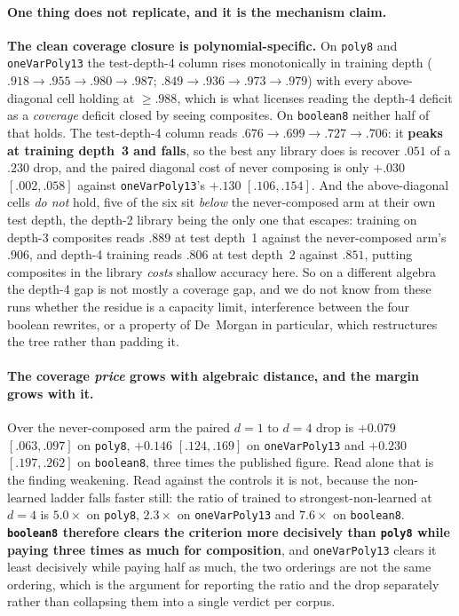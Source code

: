 \paragraph{One thing does not replicate, and it is the mechanism claim.} \textbf{The clean coverage closure is polynomial-specific.} On \texttt{poly8} and \texttt{oneVarPoly13} the test-depth-4 column rises monotonically in training depth ($.918 \to .955 \to .980 \to .987$; $.849 \to .936 \to .973 \to .979$) with every above-diagonal cell holding at ${\geq}.988$, which is what licenses reading the depth-4 deficit as a \emph{coverage} deficit closed by seeing composites. On \texttt{boolean8} neither half of that holds. The test-depth-4 column reads $.676 \to .699 \to \mathbf{.727} \to .706$: it \textbf{peaks at training depth~3 and falls}, so the best any library does is recover $.051$ of a $.230$ drop, and the paired diagonal cost of never composing is only $+.030$ $[.002,.058]$ against \texttt{oneVarPoly13}'s $+.130$ $[.106,.154]$. And the above-diagonal cells \emph{do not} hold, five of the six sit \emph{below} the never-composed arm at their own test depth, the depth-2 library being the only one that escapes: training on depth-3 composites reads $.889$ at test depth~1 against the never-composed arm's $.906$, and depth-4 training reads $.806$ at test depth~2 against $.851$, putting composites in the library \emph{costs} shallow accuracy here. So on a different algebra the depth-4 gap is not mostly a coverage gap, and we do not know from these runs whether the residue is a capacity limit, interference between the four boolean rewrites, or a property of De~Morgan in particular, which restructures the tree rather than padding it.

\paragraph{The coverage \emph{price} grows with algebraic distance, and the margin grows with it.} Over the never-composed arm the paired $d{=}1$ to $d{=}4$ drop is $+0.079$ $[.063,.097]$ on \texttt{poly8}, $+0.146$ $[.124,.169]$ on \texttt{oneVarPoly13} and $+0.230$ $[.197,.262]$ on \texttt{boolean8}, three times the published figure. Read alone that is the finding weakening. Read against the controls it is not, because the non-learned ladder falls faster still: the ratio of trained to strongest-non-learned at $d{=}4$ is $5.0\times$ on \texttt{poly8}, $2.3\times$ on \texttt{oneVarPoly13} and $7.6\times$ on \texttt{boolean8}. \textbf{\texttt{boolean8} therefore clears the criterion more decisively than \texttt{poly8} while paying three times as much for composition}, and \texttt{oneVarPoly13} clears it least decisively while paying half as much, the two orderings are not the same ordering, which is the argument for reporting the ratio and the drop separately rather than collapsing them into a single verdict per corpus.

